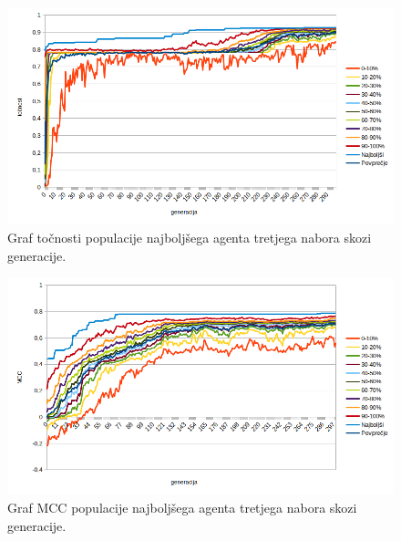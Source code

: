 \begin{figure}[H]
    \begin{center}
        \includegraphics[width=13cm]{shuttle/3/acc}
    \end{center}
    \caption{Graf točnosti populacije najboljšega agenta tretjega nabora skozi generacije.}
    \label{fig:statlog_acc_3}
\end{figure}

\begin{figure}[H]
    \begin{center}
        \includegraphics[width=13cm]{shuttle/3/mcc}
    \end{center}
    \caption{Graf MCC populacije najboljšega agenta tretjega nabora skozi generacije.}
    \label{fig:statlog_mcc_3}
\end{figure}

